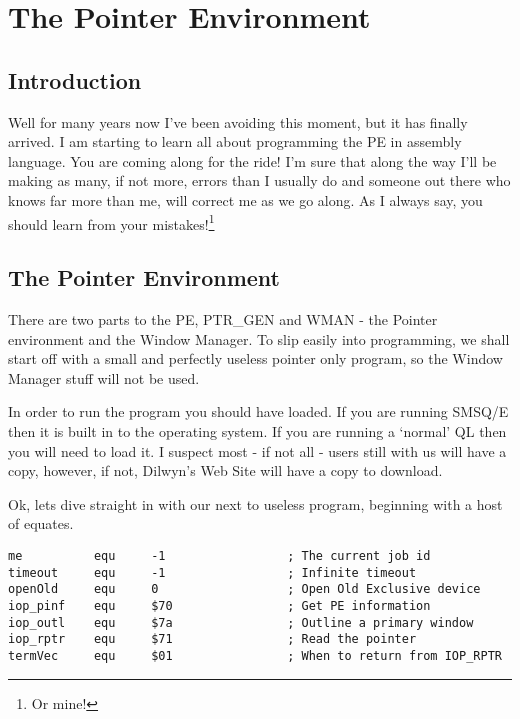 \chapter{The Pointer Environment}

\section{Introduction}
\label{ch20-intro}%

Well for many years now I've been avoiding this moment, but it has finally arrived.
I am starting to learn all about programming the PE in assembly language. You are coming
along for the ride! I'm sure that along the way I'll be making as many, if not more,
errors than I usually do and someone out there who knows far more than me, will correct me
as we go along. As I always say, you should learn from your mistakes!\footnote{Or mine!} 

\section{The Pointer Environment}
\label{ch20-the-pe}%

There are two parts to the PE, PTR\_GEN and WMAN -{} the Pointer environment and the
Window Manager. To slip easily into programming, we shall start off with a small and
perfectly useless pointer only program, so the Window Manager stuff will not be
used.

In order to run the program you should have  loaded. If you are running
SMSQ/E then it is built in to the operating system. If you are running a `normal' QL then
you will need to load it. I suspect most -{} if not all -{} users still with us will have a
copy, however, if not, Dilwyn's Web Site will have a copy to download.

Ok, lets dive straight in with our next to useless program, beginning with a host of
equates.

\begin{lstlisting}[firstnumber=1,caption={Simple PE Program - Part 1}]
me          equ     -1                 ; The current job id
timeout     equ     -1                 ; Infinite timeout
openOld     equ     0                  ; Open Old Exclusive device
iop_pinf    equ     $70                ; Get PE information
iop_outl    equ     $7a                ; Outline a primary window
iop_rptr    equ     $71                ; Read the pointer
termVec     equ     $01                ; When to return from IOP_RPTR
\end{lstlisting}

